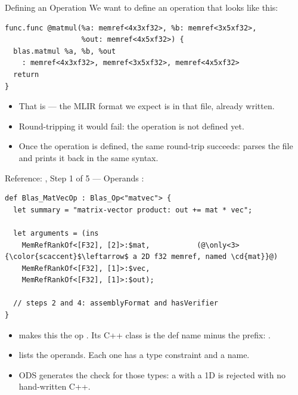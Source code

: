 \documentclass[aspectratio=169,10pt]{beamer}
\begin{document}
\begin{frame}[fragile]{Defining an Operation}
  We want to define an operation that looks like this:
\begin{lstlisting}[language=mlir]
func.func @matmul(%a: memref<4x3xf32>, %b: memref<3x5xf32>,
                  %out: memref<4x5xf32>) {
  blas.matmul %a, %b, %out
    : memref<4x3xf32>, memref<3x5xf32>, memref<4x5xf32>
  return
}
\end{lstlisting}
  \vspace{0.25em}
  \begin{itemize}
    \item<2-> That is  --- the MLIR format we
      expect is in that file, already written.
    \item<3-> Round-tripping it would \alert{fail}: the operation is not
      defined yet.
  \end{itemize}
  \vspace{0.3em}
  \begin{itemize}
    \item<4-> Once the operation is defined, the same round-trip
      \alert{succeeds}:  parses the file and prints it back
      in the same syntax.
  \end{itemize}
\end{frame}

\begin{frame}[fragile]{Reference: , Step 1 of 5 --- Operands}
  :
\begin{lstlisting}[language=ods]
def Blas_MatVecOp : Blas_Op<"matvec"> {
  let summary = "matrix-vector product: out += mat * vec";

  let arguments = (ins
    MemRefRankOf<[F32], [2]>:$mat,           (@\only<3>{\color{scaccent}$\leftarrow$ a 2D f32 memref, named \cd{mat}}@)
    MemRefRankOf<[F32], [1]>:$vec,
    MemRefRankOf<[F32], [1]>:$out);

  // steps 2 and 4: assemblyFormat and hasVerifier
}
\end{lstlisting}
  \vspace{0.4em}
  \begin{itemize}
    \item<2->  makes this the op . Its
      C++ class is the def name minus the  prefix:
      .
    \item<3->  lists the operands. Each one has a
      \alert{type constraint} and a \alert{name}.
    \item<4-> ODS generates the check for those types: a 
      with a 1D  is rejected with no hand-written C++.
  \end{itemize}
\end{frame}
\end{document}
